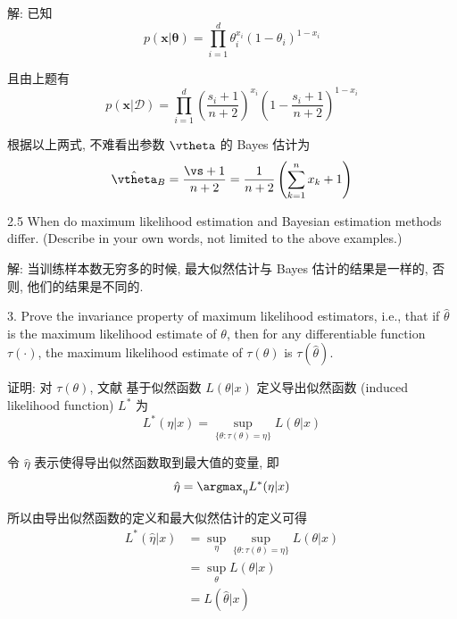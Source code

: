 \documentclass[openany]{ctexbook}
\theoremstyle{kaiti}
\theoremstyle{normal}
\begin{document}
解: 已知
\begin{equation}
  p(\bm{x}|\bm{\theta})
  =\prod_{i=1}^{d} \theta_{i}^{x_{i}}\left(1-\theta_{i}\right)^{1-x_{i}}
\end{equation}

且由上题有
\begin{equation}
  p(\bm{x}|\mathcal{D})=\prod_{i=1}^{d}\left(\frac{s_i+1}{n+2}\right)^{x_i}\left(1-\frac{s_i+1}{n+2}\right)^{1-x_i}
\end{equation}

根据以上两式, 不难看出参数 $\vtheta$ 的 Bayes 估计为
\begin{equation}
  \hat{\vtheta}_B=\frac{\vs+1}{n+2}=\frac{1}{n+2}\left(\sum_{k=1}^nx_k+1\right)
\end{equation}

2.5 When do maximum likelihood estimation and Bayesian estimation methods differ. (Describe in your own words, not limited to the above examples.)

解: 当训练样本数无穷多的时候, 最大似然估计与 Bayes 估计的结果是一样的, 否则, 他们的结果是不同的.

3. Prove the invariance property of maximum likelihood estimators, i.e., that if $\hat{\theta}$ is the maximum likelihood estimate of $\theta$, then for any differentiable function $\tau(\cdot)$, the maximum likelihood estimate of $\tau(\theta)$ is $\tau(\hat{\theta})$.

证明: 对 $\tau(\theta)$, 文献 \cite{2021george} 基于似然函数 $L(\theta|x)$ 定义导出似然函数 (induced likelihood function) $L^*$ 为
\begin{equation}
  L^*(\eta|x)=\sup_{\{\theta:\tau(\theta)=\eta\}}L(\theta|x)
\end{equation}

令 $\hat{\eta}$ 表示使得导出似然函数取到最大值的变量, 即
\begin{equation}
  \hat{\eta}=\argmax_\eta L^*(\eta|x)
\end{equation}

所以由导出似然函数的定义和最大似然估计的定义可得
\begin{equation}
  \begin{aligned}
    L^*(\hat{\eta}|x)
    &=\sup_\eta\sup_{\{\theta:\tau(\theta)=\eta\}}L(\theta|x)\\
    &=\sup_\theta L(\theta|x)\\
    &=L(\hat{\theta}|x)\\
  \end{aligned}
\end{equation}
\end{document}
